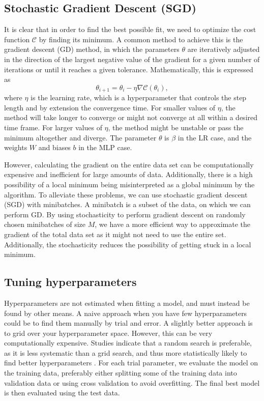 \documentclass[a4paper, 11pt, twocolumn]{article}
\begin{document}
\subsection{Stochastic Gradient Descent (SGD)}
\label{SGD}
It is clear that in order to find the best possible fit, we need to optimize the
cost function $\mathcal{C}$ by finding its minimum. A common method to achieve
this is the gradient descent (GD) method, in which the parameters $\theta$ are
iteratively adjusted in the direction of the largest negative value of the
gradient for a given number of iterations or until it reaches a given tolerance.
Mathematically, this is expressed as
\begin{equation}
\theta_{i+1} = \theta_i -\eta \nabla \mathcal{C}(\theta_i),
\end{equation}
where $\eta$ is the learning rate, which is a hyperparameter that controls the
step length and by extension the convergence time. For smaller values of $\eta$,
the method will take longer to converge or might not converge at all within a
desired time frame. For larger values of $\eta$, the method might be unstable or
pass the minimum altogether and diverge. The parameter $\theta$ is $\beta$ in
the LR case, and the weights $W$ and biases $b$ in the MLP case.

However, calculating the gradient on the entire data set can be computationally
expensive and inefficient for large amounts of data. Additionally, there is a high
possibility of a local minimum being misinterpreted as a global minimum by the
algorithm. To alleviate these problems, we can use stochastic gradient descent
(SGD) with minibatches.  A minibatch is a subset of the data, on which we can
perform GD. By using stochasticity to perform gradient descent on randomly chosen
minibatches of size $M$, we have a more efficient way to approximate the gradient
of the total data set as it might not need to use the entire set. Additionally,
the stochasticity reduces the possibility of getting stuck in a local minimum.

\subsection{Tuning hyperparameters}
Hyperparameters are not estimated when fitting a model, and must instead be
found by other means. A naive approach when you have few hyperparameters could
be to find them manually by trial and error. A slightly better approach is to
grid over your hyperparameter space. However, this can be very computationally 
expensive. Studies indicate that a random search is preferable, as it is less
systematic than a grid search, and thus more statistically likely to find better 
hyperparameters  \cite{bergstra2012random}. For each trial parameter, we evaluate 
the model on the training data, preferably either splitting some of
the training data into validation data or using cross validation to avoid overfitting.
The final best model is then evaluated using the test data.
\end{document}
